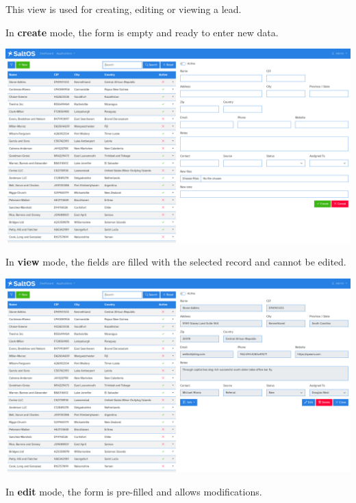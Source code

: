\documentclass[a4paper]{article}
\begin{document}
This view is used for creating, editing or viewing a lead.

In \textbf{create} mode, the form is empty and ready to enter new data.

\begin{center}\includegraphics[width=1\textwidth]{../ujest/snaps/test-screenshots-js-screenshots-crm-leads-create-en-us-1-snap.png}\end{center}

In \textbf{view} mode, the fields are filled with the selected record and cannot be edited.

\begin{center}\includegraphics[width=1\textwidth]{../ujest/snaps/test-screenshots-js-screenshots-crm-leads-view-100-en-us-1-snap.png}\end{center}

In \textbf{edit} mode, the form is pre-filled and allows modifications.
\end{document}
